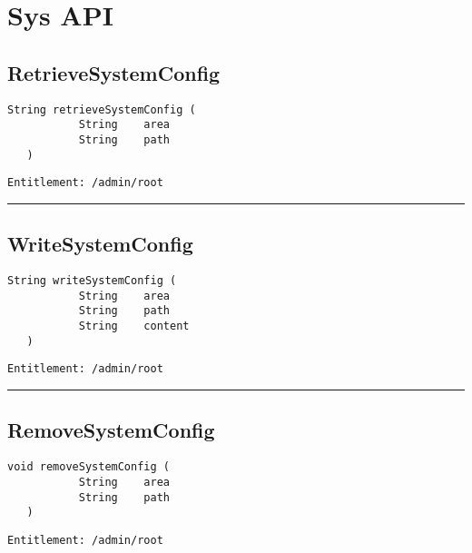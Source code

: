 \chapter{Sys API}

\section{RetrieveSystemConfig}
\label{Api:RetrieveSystemConfig}
\begin{lstlisting}[style=nonumbers]
   String retrieveSystemConfig (
           String    area
           String    path
   )
\end{lstlisting}
\begin{Verbatim}[formatcom=\color{Maroon}]
  Entitlement: /admin/root
\end{Verbatim}



\rule{12cm}{2pt}
\section{WriteSystemConfig}
\label{Api:WriteSystemConfig}
\begin{lstlisting}[style=nonumbers]
   String writeSystemConfig (
           String    area
           String    path
           String    content
   )
\end{lstlisting}
\begin{Verbatim}[formatcom=\color{Maroon}]
  Entitlement: /admin/root
\end{Verbatim}



\rule{12cm}{2pt}
\section{RemoveSystemConfig}
\label{Api:RemoveSystemConfig}
\begin{lstlisting}[style=nonumbers]
   void removeSystemConfig (
           String    area
           String    path
   )
\end{lstlisting}
\begin{Verbatim}[formatcom=\color{Maroon}]
  Entitlement: /admin/root
\end{Verbatim}



